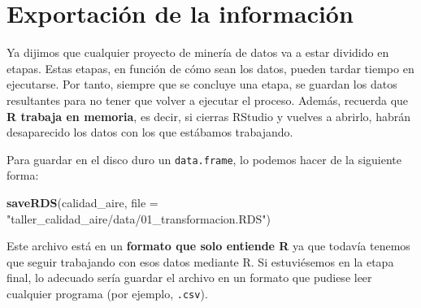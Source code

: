 \documentclass[]{article}
\newenvironment{Shaded}{\begin{snugshade}}{\end{snugshade}}
\newcommand{\DataTypeTok}[1]{\textcolor[rgb]{0.13,0.29,0.53}{#1}}
\newcommand{\KeywordTok}[1]{\textcolor[rgb]{0.13,0.29,0.53}{\textbf{#1}}}
\newcommand{\NormalTok}[1]{#1}
\newcommand{\StringTok}[1]{\textcolor[rgb]{0.31,0.60,0.02}{#1}}
\begin{document}
\hypertarget{exportacion-de-la-informacion}{%
\section{Exportación de la
información}\label{exportacion-de-la-informacion}}

Ya dijimos que cualquier proyecto de minería de datos va a estar
dividido en etapas. Estas etapas, en función de cómo sean los datos,
pueden tardar tiempo en ejecutarse. Por tanto, siempre que se concluye
una etapa, se guardan los datos resultantes para no tener que volver a
ejecutar el proceso. Además, recuerda que \textbf{R trabaja en memoria},
es decir, si cierras RStudio y vuelves a abrirlo, habrán desaparecido
los datos con los que estábamos trabajando.

Para guardar en el disco duro un \texttt{data.frame}, lo podemos hacer
de la siguiente forma:

\begin{Shaded}
\begin{Highlighting}[]
\KeywordTok{saveRDS}\NormalTok{(calidad_aire, }\DataTypeTok{file =} \StringTok{"taller_calidad_aire/data/01_transformacion.RDS"}\NormalTok{)}
\end{Highlighting}
\end{Shaded}

Este archivo está en un \textbf{formato que solo entiende R} ya que
todavía tenemos que seguir trabajando con esos datos mediante R. Si
estuviésemos en la etapa final, lo adecuado sería guardar el archivo en
un formato que pudiese leer cualquier programa (por ejemplo,
\texttt{.csv}).
\end{document}
